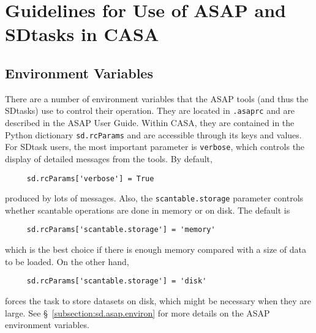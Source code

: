 \medskip


\section{Guidelines for Use of ASAP and SDtasks in CASA}
\label{section:sd.intro}

\subsection{Environment Variables}
\label{section:sd.intro.env}

There are a number of environment variables that the ASAP tools
(and thus the SDtasks) use to control their operation.
They are located in {\tt .asaprc} and are described in the ASAP User Guide.
Within CASA, they are contained in the
Python dictionary {\tt sd.rcParams} and are accessible through
its keys and values.  For SDtask users, the most important parameter is
{\tt verbose}, which controls the display of detailed
messages from the tools. By default,
\small
\begin{verbatim}
     sd.rcParams['verbose'] = True
\end{verbatim}
\normalsize
produced by lots of messages.  Also, the {\tt scantable.storage}
parameter controls whether scantable operations are done
in memory or on disk.  The default is  
\small
\begin{verbatim}
     sd.rcParams['scantable.storage'] = 'memory'  
\end{verbatim}
\normalsize
which is the best choice if there is enough memory
compared with a size of data to be loaded.  On the other hand,
\small
\begin{verbatim}
     sd.rcParams['scantable.storage'] = 'disk'
\end{verbatim}
\normalsize
forces the task to store datasets on disk, which might be necessary when they are large.
See \S~\ref{subsection:sd.asap.environ} for more details on the
ASAP environment variables.

